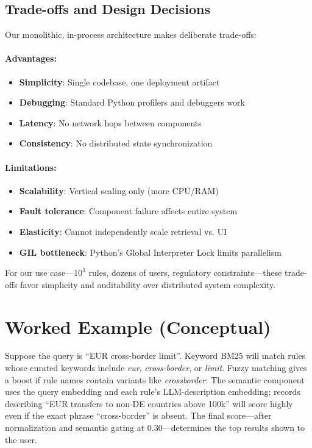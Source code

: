 \subsection{Trade-offs and Design Decisions}

Our monolithic, in-process architecture makes deliberate trade-offs:

\paragraph{Advantages:}
\begin{itemize}[leftmargin=*,itemsep=2pt,topsep=2pt]
 \item \textbf{Simplicity}: Single codebase, one deployment artifact
 \item \textbf{Debugging}: Standard Python profilers and debuggers work
 \item \textbf{Latency}: No network hops between components
 \item \textbf{Consistency}: No distributed state synchronization
\end{itemize}

\paragraph{Limitations:}
\begin{itemize}[leftmargin=*,itemsep=2pt,topsep=2pt]
 \item \textbf{Scalability}: Vertical scaling only (more CPU/RAM)
 \item \textbf{Fault tolerance}: Component failure affects entire system
 \item \textbf{Elasticity}: Cannot independently scale retrieval vs. UI
 \item \textbf{GIL bottleneck}: Python's Global Interpreter Lock limits parallelism
\end{itemize}

For our use case—$10^3$ rules, dozens of users, regulatory constraints—these trade-offs favor simplicity and auditability over distributed system complexity.

\section{Worked Example (Conceptual)}
Suppose the query is ``EUR cross-border limit''. Keyword BM25 will match rules whose curated keywords include \emph{eur}, \emph{cross-border}, or \emph{limit}. Fuzzy matching gives a boost if rule names contain variants like \emph{crossborder}. The semantic component uses the query embedding and each rule's LLM-description embedding; records describing ``EUR transfers to non-DE countries above 100k'' will score highly even if the exact phrase ``cross-border'' is absent. The final score—after normalization and semantic gating at $0.30$—determines the top results shown to the user.

